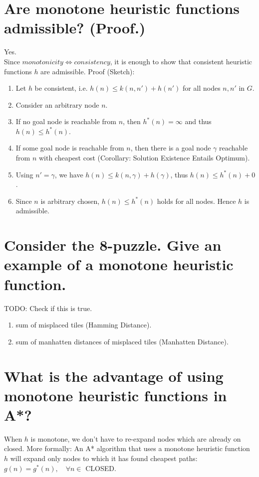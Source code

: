 \documentclass[12pt, a4paper]{article}
\begin{document}
\section{Are monotone heuristic functions admissible? (Proof.)}
Yes. \\
Since $monotonicity \Leftrightarrow consistency$, it is enough to show that consistent heuristic functions $h$ are admissible. Proof (Sketch):
\begin{enumerate}
\item Let $h$ be consistent, i.e. $h(n) \leq k(n, n') + h(n')$ for all nodes $n, n'$ in $G$.
\item Consider an arbitrary node $n$.
\item If no goal node is reachable from $n$, then $h^*(n) = \infty$ and thus $h(n) \leq h^*(n)$.
\item If some goal node is reachable from $n$, then there is a goal node $\gamma$ reachable from $n$ with cheapest cost (Corollary: Solution Existence Entails Optimum).
\item Using $n' = \gamma$, we have $h(n) \leq k(n, \gamma) + h(\gamma)$, thus $h(n) \leq h^*(n) + 0$.
\item Since $n$ is arbitrary chosen, $h(n) \leq h^*(n)$ holds for all nodes. Hence $h$ is admissible.
\end{enumerate}

\section{Consider the 8-puzzle. Give an example of a monotone heuristic function.}
TODO: Check if this is true.
\begin{enumerate}
\item sum of misplaced tiles (Hamming Distance).
\item sum of manhatten distances of misplaced tiles (Manhatten Distance).
\end{enumerate}

\section{What is the advantage of using monotone heuristic functions in A*?}
When $h$ is monotone, we don't have to re-expand nodes which are already on closed. More formally: An A* algorithm that uses a monotone heuristic function $h$ will expand only nodes to which it has found cheapest paths: $g(n) = g^*(n), \quad \forall n \in$ CLOSED. 
\end{document}
